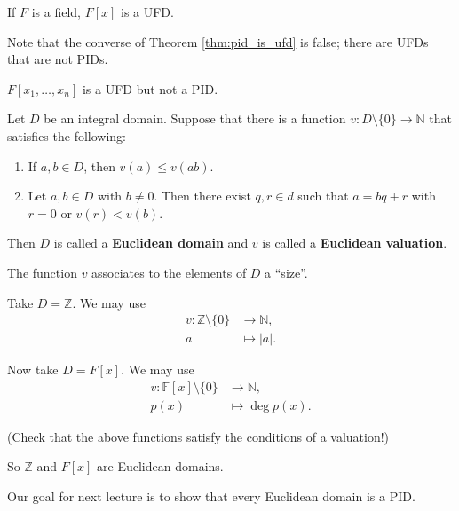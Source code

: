 \begin{corollary}
	If $F$ is a field, $F[x]$ is a UFD.
\end{corollary}

Note that the converse of Theorem \ref{thm:pid_is_ufd} is false; there are UFDs that are not PIDs.

\begin{example}
	$F[x_1,\hdots,x_n]$ is a UFD but not a PID.
\end{example}

\begin{definition}
	Let $D$ be an integral domain. Suppose that there is a function $v\colon D\setminus\{0\}\to\mathbb N$ that satisfies the following:
	\begin{enumerate}
		\item If $a,b\in D$, then $v(a)\leq v(ab)$.
		\item Let $a,b\in D$ with $b\neq 0$. Then there exist $q,r\in d$ such that $a=bq+r$ with $r=0$ or $v(r)<v(b)$.
	\end{enumerate}
	Then $D$ is called a \textbf{Euclidean domain} and $v$ is called a \textbf{Euclidean valuation}.
\end{definition}

The function $v$ associates to the elements of $D$ a ``size''.

\begin{example}
	Take $D=\mathbb Z$. We may use
	\begin{align}
		v\colon\mathbb Z\setminus\{0\}&\to\mathbb N,\\
		a&\mapsto |a|.
	\end{align}

	Now take $D=F[x]$. We may use
	\begin{align}
		v\colon\mathbb F[x]\setminus\{0\}&\to\mathbb N,\\
		p(x)&\mapsto \deg p(x).
	\end{align}

	(Check that the above functions satisfy the conditions of a valuation!)

	So $\mathbb Z$ and $F[x]$ are Euclidean domains.
\end{example}

Our goal for next lecture is to show that every Euclidean domain is a PID.